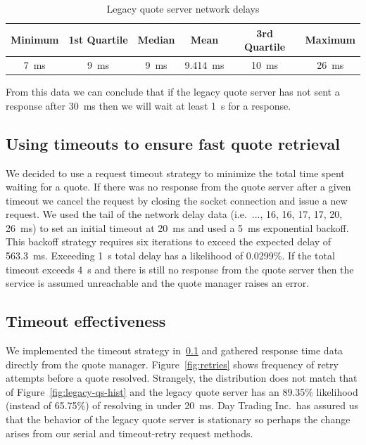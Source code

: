 \begin{table}[htpb]
  \centering
  \caption{Legacy quote server network delays}
  \label{tbl:qs-net-delay}
  \begin{tabular}{@{}cccccc@{}}
    \toprule
    Minimum & 1st Quartile & Median & Mean & 3rd Quartile & Maximum \\ 
    \midrule
    \SI{7}{\milli\second} & \SI{9}{\milli\second} & \SI{9}{\milli\second} & \SI{9.414}{\milli\second} & \SI{10}{\milli\second} & \SI{26}{\milli\second} \\ 
    \bottomrule
  \end{tabular}
\end{table}

From this data we can conclude that if the legacy quote server has not sent a response after \SI{30}{\milli\second} then we will wait at least \SI{1}{\second} for a response.

\subsection{Using timeouts to ensure fast quote retrieval}\label{sec:qs-timeout}
We decided to use a request timeout strategy to minimize the total time spent waiting for a quote.
If there was no response from the quote server after a given timeout we cancel the request by closing the socket connection and issue a new request.
We used the tail of the network delay data (i.e.\ ..., 16, 16, 17, 17, 20, \SI{26}{\milli\second}) to set an initial timeout at \SI{20}{\milli\second} and used a \SI{5}{\milli\second} exponential backoff.
This backoff strategy requires six iterations to exceed the expected delay of \SI{563.3}{\milli\second}.
Exceeding \SI{1}{\second} total delay has a likelihood of 0.0299\%.
If the total timeout exceeds \SI{4}{\second} and there is still no response from the quote server then the service is assumed unreachable and the quote manager raises an error.

\subsection{Timeout effectiveness}
We implemented the timeout strategy in~\ref{sec:qs-timeout} and gathered response time data directly from the quote manager.
Figure~\ref{fig:retries} shows frequency of retry attempts before a quote resolved.
Strangely, the distribution does not match that of Figure~\ref{fig:legacy-qs-hist} and the legacy quote server has an 89.35\% likelihood (instead of 65.75\%) of resolving in under \SI{20}{\milli\second}.
Day Trading Inc.\ has assured us that the behavior of the legacy quote server is stationary so perhaps the change arises from our serial and timeout-retry request methods.


